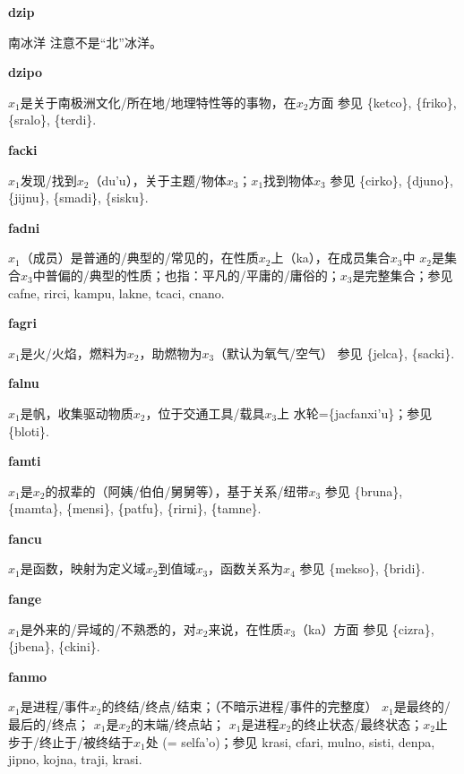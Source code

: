 \documentclass[notitlepage,twocolumn,a4paper,10pt]{book}
\begin{document}
{\sffamily\bfseries dzip} 南冰洋 \textemdash{} 注意不是“北”冰洋。

{\sffamily\bfseries dzipo}\enspace {\ttfamily\bfseries[zip     zi'o]}  $x_1$是关于南极洲文化\slash{}所在地\slash{}地理特性等的事物，在$x_2$方面 \textemdash{} 参见 \{ketco\}, \{friko\}, \{sralo\}, \{terdi\}.

{\sffamily\bfseries facki}\enspace {\ttfamily\bfseries[fak     fa'i]}  $x_1$发现\slash{}找到$x_2$（du'u），关于主题\slash{}物体$x_3$；$x_1$找到物体$x_3$ \textemdash{} 参见 \{cirko\}, \{djuno\}, \{jijnu\}, \{smadi\}, \{sisku\}.

{\sffamily\bfseries fadni}\enspace {\ttfamily\bfseries[fad]}  $x_1$（成员）是普通的\slash{}典型的\slash{}常见的，在性质$x_2$上（ka），在成员集合$x_3$中 \textemdash{} $x_2$是集合$x_3$中普偏的\slash{}典型的性质；也指：平凡的\slash{}平庸的\slash{}庸俗的；$x_3$是完整集合；参见 {cafne}, {rirci}, {kampu}, {lakne}, {tcaci}, {cnano}.

{\sffamily\bfseries fagri}\enspace {\ttfamily\bfseries[fag]}  $x_1$是火\slash{}火焰，燃料为$x_2$，助燃物为$x_3$（默认为氧气\slash{}空气） \textemdash{} 参见 \{jelca\}, \{sacki\}.

{\sffamily\bfseries falnu}\enspace {\ttfamily\bfseries[fan]}  $x_1$是帆，收集驱动物质$x_2$，位于交通工具\slash{}载具$x_3$上 \textemdash{} 水轮=\{jacfanxi'u\}；参见 \{bloti\}.

{\sffamily\bfseries famti} $x_1$是$x_2$的叔辈的（阿姨\slash{}伯伯\slash{}舅舅等），基于关系\slash{}纽带$x_3$ \textemdash{} 参见 \{bruna\}, \{mamta\}, \{mensi\}, \{patfu\}, \{rirni\}, \{tamne\}.

{\sffamily\bfseries fancu} $x_1$是函数，映射为定义域$x_2$到值域$x_3$，函数关系为$x_4$ \textemdash{} 参见 \{mekso\}, \{bridi\}.

{\sffamily\bfseries fange} $x_1$是外来的\slash{}异域的\slash{}不熟悉的，对$x_2$来说，在性质$x_3$（ka）方面 \textemdash{} 参见 \{cizra\}, \{jbena\}, \{ckini\}.

{\sffamily\bfseries fanmo}\enspace {\ttfamily\bfseries[fam     fa'o]}  $x_1$是进程\slash{}事件$x_2$的终结\slash{}终点\slash{}结束；（不暗示进程\slash{}事件的完整度） \textemdash{} $x_1$是最终的\slash{}最后的\slash{}终点； $x_1$是$x_2$的末端\slash{}终点站； $x_1$是进程$x_2$的终止状态\slash{}最终状态；$x_2$止步于\slash{}终止于\slash{}被终结于$x_1$处 (= selfa'o)；参见 {krasi}, {cfari}, {mulno}, {sisti}, {denpa}, {jipno}, {kojna}, {traji}, {krasi}.
\end{document}
